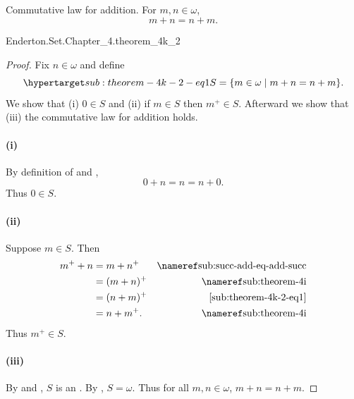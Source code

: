 \documentclass{report}
\begin{document}
\subsection{}%

  \begin{theorem}[4K-2]
    Commutative law for addition.
    For $m, n \in \omega$, $$m + n = n + m.$$
  \end{theorem}

    {Enderton.Set.Chapter\_4.theorem\_4k\_2}


  \begin{proof}

    Fix $n \in \omega$ and define
      \begin{equation}
        \hyperlabel{sub:theorem-4k-2-eq1}
        S = \{m \in \omega \mid m + n = n + m\}.
      \end{equation}
    We show that (i) $0 \in S$ and (ii) if $m \in S$ then $m^+ \in S$.
    Afterward we show that (iii) the commutative law for addition holds.

    \paragraph{(i)}%

      By definition of  and
        , $$0 + n = n = n + 0.$$
      Thus $0 \in S$.

    \paragraph{(ii)}%

      Suppose $m \in S$.
      Then
        \begin{align*}
          m^+ + n
            & = m + n^+ & \textref{sub:succ-add-eq-add-succ} \\
            & = (m + n)^+ & \textref{sub:theorem-4i} \\
            & = (n + m)^+ & \eqref{sub:theorem-4k-2-eq1} \\
            & = n + m^+. & \textref{sub:theorem-4i}
        \end{align*}
      Thus $m^+ \in S$.

    \paragraph{(iii)}%

      By  and , $S$
        is an .
      By , $S = \omega$.
      Thus for all $m, n \in \omega$, $m + n = n + m$.

  \end{proof}
\end{document}
